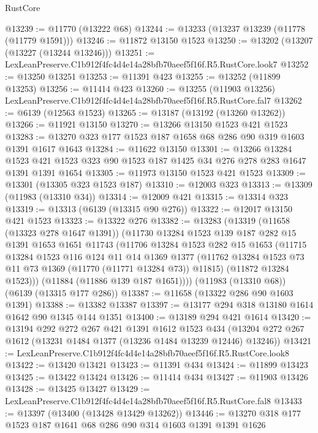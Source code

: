 \begin{lexlean}{RustCore}
\begin{coremodule}
@13239 := @11770 (@13222 @68)
@13244 := @13233 (@13237 @13239 (@11778 (@11779 @1591)))
@13246 := @11872 @13150 @1523
@13250 := @13202 (@13207 (@13227 (@13244 @13246)))
@13251 := LexLeanPreserve.C1b912f4fc4d4e14a28bfb70aeef5f16f.R5.RustCore.look7
@13252 := @13250 @13251
@13253 := @11391 @423
@13255 := @13252 (@11899 @13253)
@13256 := @11414 @423
@13260 := @13255 (@11903 @13256) LexLeanPreserve.C1b912f4fc4d4e14a28bfb70aeef5f16f.R5.RustCore.fal7
@13262 := @6139 (@12563 @1523)
@13265 := @13187 (@13192 (@13260 @13262))
@13266 := @11921 @13150
@13270 := @13266 @13150 @1523 @421 @1523
@13283 := @13270 @323 @177 @1523 @187 @1658 @68 @286 @90 @319 @1603 @1391 @1617 @1643
@13284 := @11622 @13150
@13301 := @13266
    @13284
    @1523
    @421
    @1523
    @323
    @90
    @1523
    @187
    @1425
    @34
    @276
    @278
    @283
    @1647
    @1391
    @1391
    @1654
@13305 := @11973 @13150 @1523 @421 @1523
@13309 := @13301 (@13305 @323 @1523 @187)
@13310 := @12003 @323
@13313 := @13309 (@11983 (@13310 @34))
@13314 := @12009 @421
@13315 := @13314 @323
@13319 := @13313 (@6139 (@13315 @90 @276))
@13322 := @12017 @13150 @421 @1523
@13323 := @13322 @276
@13382 := @13283
    (@13319
      (@11658 (@13323 @278 @1647 @1391))
      (@11730
        @13284
        @1523
        @139
        @187
        @282
        @15
        @1391
        @1653
        @1651
        @11743
        (@11706
          @13284
          @1523
          @282
          @15
          @1653
          (@11715
            @13284
            @1523
            @116
            @124
            @11
            @14
            @1369
            @1377
            (@11762 @13284 @1523 @73 @11 @73 @1369 (@11770 (@11771 @13284 @73)) @11815)
            (@11872 @13284 @1523)))
        (@11884 (@11886 @139 @187 @1651))))
    (@11983 (@13310 @68))
    (@6139 (@13315 @177 @286))
@13387 := @11658 (@13322 @286 @90 @1603 @1391)
@13388 := @13382 @13387
@13397 := @13177 @294 @318 @13180 @1614 @1642 @90 @1345 @144 @1351
@13400 := @13189 @294 @421 @1614
@13420 := @13194
    @292
    @272
    @267
    @421
    @1391
    @1612
    @1523
    @434
    (@13204 @272 @267 @1612 (@13231 @1484 @1377 (@13236 @1484 @13239 @12446) @13246))
@13421 := LexLeanPreserve.C1b912f4fc4d4e14a28bfb70aeef5f16f.R5.RustCore.look8
@13422 := @13420 @13421
@13423 := @11391 @434
@13424 := @11899 @13423
@13425 := @13422 @13424
@13426 := @11414 @434
@13427 := @11903 @13426
@13428 := @13425 @13427
@13429 := LexLeanPreserve.C1b912f4fc4d4e14a28bfb70aeef5f16f.R5.RustCore.fal8
@13433 := @13397 (@13400 (@13428 @13429 @13262))
@13446 := @13270 @318 @177 @1523 @187 @1641 @68 @286 @90 @314 @1603 @1391 @1391 @1626

\end{coremodule}
\end{lexlean}
